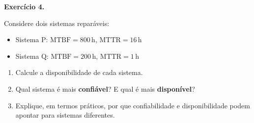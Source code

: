 \documentclass[12pt,a4paper]{article}
\newif\ifgabarito
\newcommand{\A}{\mathrm{A}}
\newcommand{\MTTF}{\mathrm{MTTF}}
\newcommand{\MTBF}{\mathrm{MTBF}}
\newcommand{\MTTR}{\mathrm{MTTR}}
\newcommand{\questao}[2][8]{%
  \needspace{#1\baselineskip}%
  \noindent\textbf{Exercício #2.}%
}
\begin{document}
\ifgabarito
\begin{tcolorbox}[gabarito]
\begin{enumerate}[label=\alph*),nosep]
  \item $\MTTR = 6{,}5/4 = 1{,}625\,\text{h}$. Tempo operacional: $60{\times}24 - 6{,}5 = 1433{,}5\,\text{h}$. $\MTTF = 1433{,}5/4 = 358{,}375\,\text{h}$. $\MTBF = \MTTF + \MTTR = \mathbf{360\,\text{h}}$.
  \item $\MTTR = (2{,}0+1{,}0+3{,}0+0{,}5)/4 = \mathbf{1{,}625\,\text{h}}$.
  \item $\A = \MTTF/\MTBF = 358{,}375/360 \approx \mathbf{99{,}55\%}$.
  \item $\text{Downtime anual} \approx (1-0{,}9955)\times 8760 \approx \mathbf{39{,}4\,\text{h/ano}}$.
\end{enumerate}
\end{tcolorbox}
\fi

\vspace{8pt}

\questao[10]{4}
Considere dois sistemas reparáveis:
\begin{itemize}[nosep]
  \item Sistema P: $\MTBF = 800\,\text{h}$, $\MTTR = 16\,\text{h}$
  \item Sistema Q: $\MTBF = 200\,\text{h}$, $\MTTR = 1\,\text{h}$
\end{itemize}
\begin{enumerate}[label=\alph*)]
  \item Calcule a disponibilidade de cada sistema.
  \item Qual sistema é mais \textbf{confiável}? E qual é mais \textbf{disponível}?
  \item Explique, em termos práticos, por que confiabilidade e disponibilidade podem apontar para sistemas diferentes.
\end{enumerate}

\ifgabarito
\begin{tcolorbox}[gabarito]
\begin{enumerate}[label=\alph*),nosep]
  \item P: $\A = 800/(800+16) \approx \mathbf{98{,}0\%}$; \quad Q: $\A = 200/(200+1) \approx \mathbf{99{,}5\%}$.
  \item Mais \textbf{confiável}: P ($\MTBF = 800\,\text{h}$); mais \textbf{disponível}: Q ($\A \approx 99{,}5\%$).
  \item Um sistema pode falhar com frequência, mas ser reparado rapidamente (alta disponibilidade, baixa confiabilidade). Outro falha raramente, porém demora muito para ser restaurado (alta confiabilidade, disponibilidade moderada).
\end{enumerate}
\end{tcolorbox}
\fi
\end{document}
